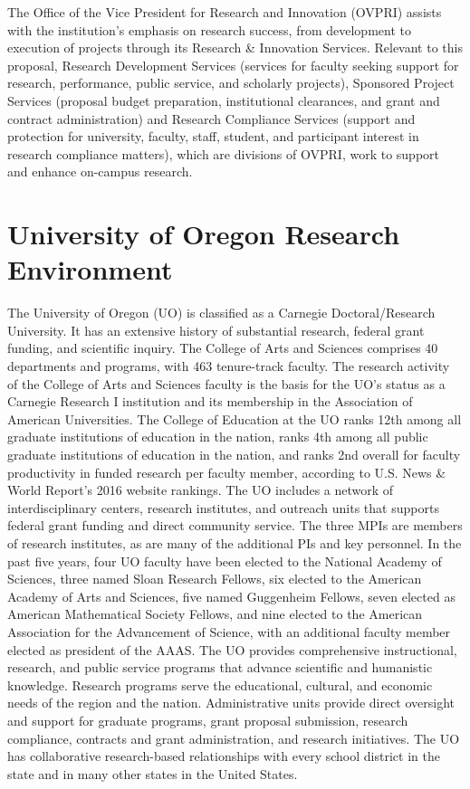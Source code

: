 \documentclass[
]{book}
\begin{document}
The Office of the Vice President for Research and Innovation (OVPRI) assists with the institution's emphasis on research success, from development to execution of projects through its Research \& Innovation Services. Relevant to this proposal, Research Development Services (services for faculty seeking support for research, performance, public service, and scholarly projects), Sponsored Project Services (proposal budget preparation, institutional clearances, and grant and contract administration) and Research Compliance Services (support and protection for university, faculty, staff, student, and participant interest in research compliance matters), which are divisions of OVPRI, work to support and enhance on-campus research.

\hypertarget{university-of-oregon-research-environment}{%
\section{University of Oregon Research Environment}\label{university-of-oregon-research-environment}}

The University of Oregon (UO) is classified as a Carnegie Doctoral/Research University. It has an extensive history of substantial research, federal grant funding, and scientific inquiry. The College of Arts and Sciences comprises 40 departments and programs, with 463 tenure-track faculty. The research activity of the College of Arts and Sciences faculty is the basis for the UO's status as a Carnegie Research I institution and its membership in the Association of American Universities. The College of Education at the UO ranks 12th among all graduate institutions of education in the nation, ranks 4th among all public graduate institutions of education in the nation, and ranks 2nd overall for faculty productivity in funded research per faculty member, according to U.S. News \& World Report's 2016 website rankings. The UO includes a network of interdisciplinary centers, research institutes, and outreach units that supports federal grant funding and direct community service. The three MPIs are members of research institutes, as are many of the additional PIs and key personnel. In the past five years, four UO faculty have been elected to the National Academy of Sciences, three named Sloan Research Fellows, six elected to the American Academy of Arts and Sciences, five named Guggenheim Fellows, seven elected as American Mathematical Society Fellows, and nine elected to the American Association for the Advancement of Science, with an additional faculty member elected as president of the AAAS. The UO provides comprehensive instructional, research, and public service programs that advance scientific and humanistic knowledge. Research programs serve the educational, cultural, and economic needs of the region and the nation. Administrative units provide direct oversight and support for graduate programs, grant proposal submission, research compliance, contracts and grant administration, and research initiatives. The UO has collaborative research-based relationships with every school district in the state and in many other states in the United States.
\end{document}
